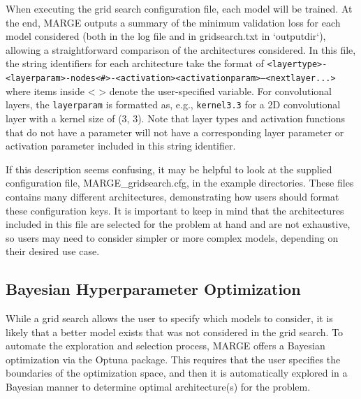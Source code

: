 \documentclass[letterpaper, 12pt]{article}
\begin{document}
\noindent When executing the grid search configuration file, each model will 
be trained.  At the end, MARGE outputs a summary of the minimum validation loss 
for each model considered (both in the log file and in gridsearch.txt in 
`outputdir`), allowing a straightforward comparison of the architectures 
considered.  In this file, the string identifiers for each architecture take the format of \newline
\texttt{{\textless}layertype{\textgreater}-{\textless}layerparam{\textgreater}-nodes{\textless}\#{\textgreater}-{\textless}activation{\textgreater}{\textless}activationparam{\textgreater}--{\textless}nextlayer...{\textgreater}} \newline
where items inside {\textless} {\textgreater} denote the user-specified variable. 
For convolutional layers, the \texttt{layerparam} is formatted as, e.g., 
\texttt{kernel3.3} for a 2D convolutional layer with a kernel size of (3, 3).
Note that layer types and activation functions that do not have a parameter 
will not have a corresponding layer parameter or activation parameter included 
in this string identifier. \newline

\noindent If this description seems confusing, it may be helpful to look at 
the supplied configuration file, MARGE\_gridsearch.cfg, in the example 
directories.  These files contains many different architectures, demonstrating 
how users should format these configuration keys.  It is important to keep in 
mind that the architectures included in this file are selected for the problem 
at hand and are not exhaustive, so users may need to consider simpler or more 
complex models, depending on their desired use case.


\subsection{Bayesian Hyperparameter Optimization}

While a grid search allows the user to specify which models to consider, it is 
likely that a better model exists that was not considered in the grid search.  
To automate the exploration and selection process, MARGE offers a Bayesian 
optimization via the Optuna package.  This requires that the user specifies the 
boundaries of the optimization space, and then it is automatically explored in 
a Bayesian manner to determine optimal architecture(s) for the problem.
\end{document}
